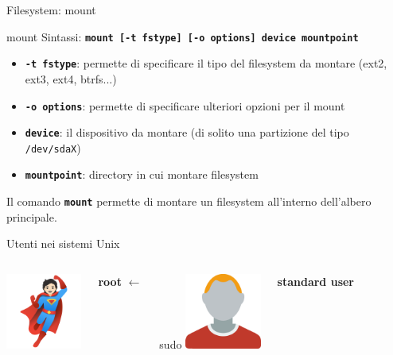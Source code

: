 \documentclass{beamer}
\begin{document}
    \begin{frame}{Filesystem: mount}
        \begin{block}{mount}
            \small
            Sintassi: \texttt{\textbf{mount [-t fstype] [-o options] device mountpoint}}

            \begin{itemize}
                \item \texttt{\textbf{-t fstype}}: permette di specificare il tipo del filesystem da montare (ext2, ext3, ext4, btrfs...)
                \item \texttt{\textbf{-o options}}: permette di specificare ulteriori opzioni per il mount
                \item \texttt{\textbf{device}}: il dispositivo da montare (di solito una partizione del tipo \texttt{/dev/sdaX})
                \item \texttt{\textbf{mountpoint}}: directory in cui montare filesystem
            \end{itemize}

            Il comando \texttt{\textbf{mount}} permette di montare un filesystem all'interno
            dell'albero principale.
        \end{block}
    \end{frame}

    \begin{frame}{Utenti nei sistemi Unix}
        \begin{columns}[t, onlytextwidth]
                \centering
                \includegraphics[height=2.5cm, keepaspectratio]{images/root.pdf}

                \large \textbf{root}
                \centering
                \Huge $\longleftarrow$

                \large sudo
                \centering
                \includegraphics[height=2.5cm, keepaspectratio]{images/user2.pdf}

                \large \textbf{standard user}
        \end{columns}
    \end{frame}
\end{document}

